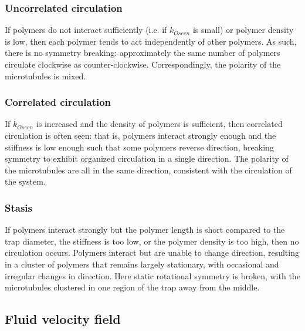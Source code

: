 \documentclass[11pt]{ucthesis}
\begin{document}
\subsubsection{Uncorrelated circulation}

If polymers do not interact sufficiently (i.e. if $k_{Oseen}$ is small) or polymer density is low, then each polymer tends to act independently of other polymers. As such, there is no symmetry breaking: approximately the same number of polymers circulate clockwise as counter-clockwise.  Correspondingly, the polarity of the microtubules is mixed.

\subsubsection{Correlated circulation}

If $k_{Oseen}$ is increased and the density of polymers is sufficient, then correlated circulation is often seen: that is, polymers interact strongly enough and the stiffness is low enough such that some polymers reverse direction, breaking symmetry to exhibit organized circulation in a single direction. The polarity of the microtubules are all in the same direction, consistent with the circulation of the system.

\subsubsection{Stasis}

If polymers interact strongly but the polymer length is short compared to the trap diameter, the stiffness is too low, or the polymer density is too high, then no circulation occurs. Polymers interact but are unable to change direction, resulting in a cluster of polymers that remains largely stationary, with occasional and irregular changes in direction. Here static rotational symmetry is broken, with the microtubules clustered in one region of the trap away from the middle.

\subsection{Fluid velocity field}
\end{document}
